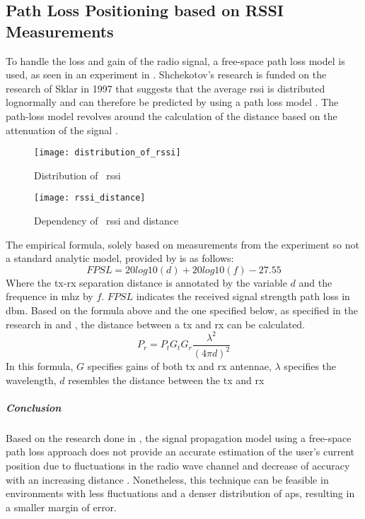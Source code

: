 \subsection{Path Loss Positioning based on RSSI Measurements}
To handle the loss and gain of the radio signal, a free-space path loss model is used, as seen in an experiment in \cite[p.178]{Shchekotov}. Shchekotov's research is funded on the research of Sklar in 1997 that suggests that the average \acrshort{rssi} is distributed lognormally and can therefore be predicted by using a path loss model \cite[p.16]{S2016}. The path-loss model revolves around the calculation of the distance based on the attenuation of the signal \cite{Mautz}.
\begin{figure}[h!]
\centering
\texttt{[image: distribution\_of\_rssi]}
\caption{Distribution of ~\acrlong{rssi} ~\cite[p.16]{S2016}}
\label{fig:distribution_rssi}
\end{figure}
\begin{figure}[h!]
\centering
\texttt{[image: rssi\_distance]}
\caption{Dependency of ~\acrlong{rssi} and distance ~\cite[p.61]{Mautz}}
\label{fig:rssi_distance}
\end{figure}
The empirical formula, solely based on measurements from the experiment so not a standard analytic model, provided by \cite{S2016} is as follows:
\[
FPSL = 20log10(d) + 20log10(f) - 27.55
\]
Where the \acrlong{tx}-\acrlong{rx} separation distance is annotated by the variable $d$ and the frequence in \acrfull{mhz} by $f$. $FPSL$ indicates the received signal strength path loss in \acrfull{dbm}. Based on the formula above and the one specified below, as specified in the research in \cite[p~13]{S2016} and \cite[p~6]{Wang2003}, the distance between a \acrlong{tx} and \acrlong{rx} can be calculated.
\[
P_r = P_t G_t G_r \frac{\lambda^2}{(4 \pi d)^2}
\]
In this formula, $G$ specifies gains of both \acrshort{tx} and \acrshort{rx} antennae, $\lambda$ specifies the wavelength, $d$ resembles the distance between the \acrlong{tx} and \acrlong{rx}
\subparagraph{Conclusion}
Based on the research done in \cite{Shchekotov}, the signal propagation model using a free-space path loss approach does not provide an accurate estimation of the user's current position due to fluctuations in the radio wave channel and decrease of accuracy with an increasing distance \cite[p~61]{Mautz} \cite[p~2]{Loy2018}. Nonetheless, this technique can be feasible in environments with less fluctuations and a denser distribution of \acrshort{ap}s, resulting in a smaller margin of error. 
